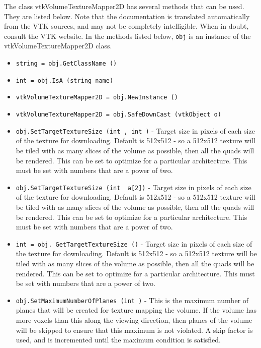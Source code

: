 The class vtkVolumeTextureMapper2D has several methods that can be used.
  They are listed below.
Note that the documentation is translated automatically from the VTK sources,
and may not be completely intelligible.  When in doubt, consult the VTK website.
In the methods listed below, \verb|obj| is an instance of the vtkVolumeTextureMapper2D class.
\begin{itemize}
\item  \verb|string = obj.GetClassName ()|

\item  \verb|int = obj.IsA (string name)|

\item  \verb|vtkVolumeTextureMapper2D = obj.NewInstance ()|

\item  \verb|vtkVolumeTextureMapper2D = obj.SafeDownCast (vtkObject o)|

\item  \verb|obj.SetTargetTextureSize (int , int )| -  Target size in pixels of each size of the texture for downloading. Default is
 512x512 - so a 512x512 texture will be tiled with as many slices of the volume
 as possible, then all the quads will be rendered. This can be set to optimize
 for a particular architecture. This must be set with numbers that are a power
 of two.

\item  \verb|obj.SetTargetTextureSize (int  a[2])| -  Target size in pixels of each size of the texture for downloading. Default is
 512x512 - so a 512x512 texture will be tiled with as many slices of the volume
 as possible, then all the quads will be rendered. This can be set to optimize
 for a particular architecture. This must be set with numbers that are a power
 of two.

\item  \verb|int = obj. GetTargetTextureSize ()| -  Target size in pixels of each size of the texture for downloading. Default is
 512x512 - so a 512x512 texture will be tiled with as many slices of the volume
 as possible, then all the quads will be rendered. This can be set to optimize
 for a particular architecture. This must be set with numbers that are a power
 of two.

\item  \verb|obj.SetMaximumNumberOfPlanes (int )| -  This is the maximum number of planes that will be created for texture mapping
 the volume. If the volume has more voxels than this along the viewing direction,
 then planes of the volume will be skipped to ensure that this maximum is not
 violated. A skip factor is used, and is incremented until the maximum condition
 is satisfied.


\end{itemize}
